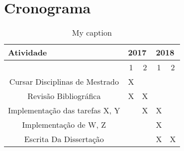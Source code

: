 \documentclass[a4paper,10pt]{article}
\begin{document}
\section{Cronograma}
\begin{table}[!h]
	\centering
	\caption{My caption}
	\label{my-label}
	\begin{tabular}{|c|c|c|c|c|}
		\hline
		\multicolumn{1}{|l|}{Atividade} & \multicolumn{2}{l|}{2017} & \multicolumn{2}{l|}{2018} \\ \hline
		& 1\degree    & 2\degree    & 1\degree    & 2\degree    \\ \hline
		Cursar Disciplinas de Mestrado  & X           &             &             &             \\ \hline
		Revisão Bibliográfica           & X           & X           &             &             \\ \hline
		Implementação das tarefas X, Y  &             & X           & X           &             \\ \hline
		Implementação de W, Z     &             &             & X           &             \\ \hline
		Escrita Da Dissertação          &             &             & X           & X           \\ \hline
	\end{tabular}
\end{table}



	
	
	
\end{document}
